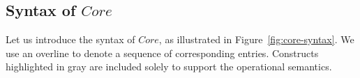 \documentclass[acmsmall]{acmart}
\newcommand{\ap}{~}
\newcommand{\keyword}[1]{\mathbf{#1}}
\begin{document}

\subsection{Syntax of $Core$} \label{subsec:syntax-core}

Let us introduce the syntax of $Core$, as illustrated in Figure~\ref{fig:core-syntax}.
We use an overline to denote a sequence of corresponding entries.
Constructs highlighted in gray are included solely to support the operational semantics.
\end{document}
